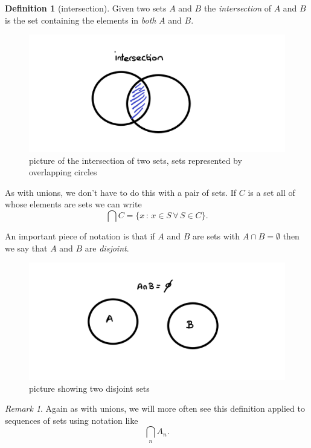 \documentclass[
]{book}
\theoremstyle{definition}
\newtheorem{definition}{Definition}[chapter]
\theoremstyle{definition}
\theoremstyle{definition}
\theoremstyle{definition}
\theoremstyle{remark}
\newtheorem*{remark}{Remark}
\begin{document}
\begin{definition}[intersection]

Given two sets \(A\) and \(B\) the \emph{intersection} of \(A\) and \(B\) is the set containing the elements in \emph{both} \(A\) and \(B\).

\begin{figure}
\centering
\includegraphics{intersection.png}
\caption{\label{fig:unnamed-chunk-10}picture of the intersection of two sets, sets represented by overlapping circles}
\end{figure}

As with unions, we don't have to do this with a pair of sets. If \(C\) is a set all of whose elements are sets we can write
\[ \bigcap C = \{ x \,:\,  x \in S \, \forall \, S \in C\}.  \]

An important piece of notation is that if \(A\) and \(B\) are sets with \(A \cap B = \emptyset\) then we say that \(A\) and \(B\) are \emph{disjoint}.

\begin{figure}
\centering
\includegraphics{disjoint.png}
\caption{\label{fig:unnamed-chunk-11}picture showing two disjoint sets}
\end{figure}

\end{definition}

\begin{remark}
Again as with unions, we will more often see this definition applied to sequences of sets using notation like
\[ \bigcap_n A_n.  \]
\end{remark}
\end{document}
